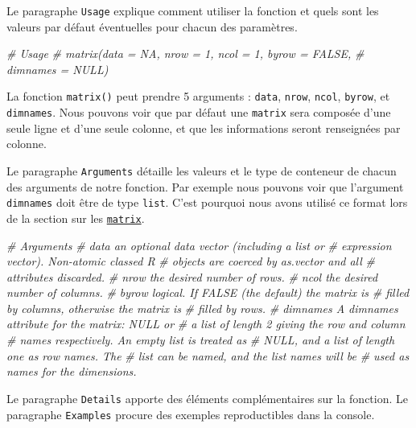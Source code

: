 \documentclass[twoside,symmetric]{book}
\newenvironment{Shaded}{}{}
\newcommand{\CommentTok}[1]{\textit{#1}}
\begin{document}
Le paragraphe \texttt{Usage} explique comment utiliser la fonction et quels sont les valeurs par défaut éventuelles pour chacun des paramètres.

\begin{Shaded}
\begin{Highlighting}[]
\CommentTok{# Usage}
\CommentTok{# matrix(data = NA, nrow = 1, ncol = 1, byrow = FALSE,}
\CommentTok{#        dimnames = NULL)}
\end{Highlighting}
\end{Shaded}

La fonction \texttt{matrix()} peut prendre 5 arguments : \texttt{data}, \texttt{nrow}, \texttt{ncol}, \texttt{byrow}, et \texttt{dimnames}. Nous pouvons voir que par défaut une \texttt{matrix} sera composée d'une seule ligne et d'une seule colonne, et que les informations seront renseignées par colonne.

Le paragraphe \texttt{Arguments} détaille les valeurs et le type de conteneur de chacun des arguments de notre fonction. Par exemple nous pouvons voir que l'argument \texttt{dimnames} doit être de type \texttt{list}. C'est pourquoi nous avons utilisé ce format lors de la section sur les \protect\hyperlink{l014matrix}{\texttt{matrix}}.

\begin{Shaded}
\begin{Highlighting}[]
\CommentTok{# Arguments}
\CommentTok{# data      an optional data vector (including a list or }
\CommentTok{#           expression vector). Non-atomic classed R }
\CommentTok{#           objects are coerced by as.vector and all }
\CommentTok{#           attributes discarded.}
\CommentTok{# nrow      the desired number of rows.}
\CommentTok{# ncol      the desired number of columns.}
\CommentTok{# byrow     logical. If FALSE (the default) the matrix is }
\CommentTok{#           filled by columns, otherwise the matrix is }
\CommentTok{#           filled by rows.}
\CommentTok{# dimnames  A dimnames attribute for the matrix: NULL or }
\CommentTok{#           a list of length 2 giving the row and column }
\CommentTok{#           names respectively. An empty list is treated as }
\CommentTok{#           NULL, and a list of length one as row names. The }
\CommentTok{#           list can be named, and the list names will be }
\CommentTok{#           used as names for the dimensions.}
\end{Highlighting}
\end{Shaded}

Le paragraphe \texttt{Details} apporte des éléments complémentaires sur la fonction. Le paragraphe \texttt{Examples} procure des exemples reproductibles dans la console.
\end{document}
